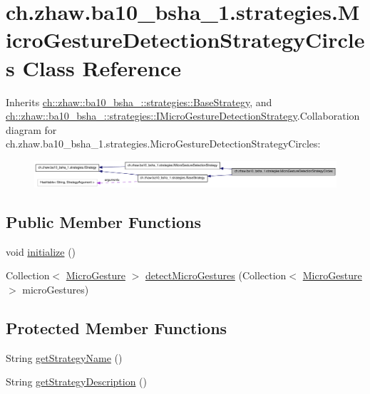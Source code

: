 \hypertarget{classch_1_1zhaw_1_1ba10__bsha__1_1_1strategies_1_1MicroGestureDetectionStrategyCircles}{
\section{ch.zhaw.ba10\_\-bsha\_\-1.strategies.MicroGestureDetectionStrategyCircles Class Reference}
\label{classch_1_1zhaw_1_1ba10__bsha__1_1_1strategies_1_1MicroGestureDetectionStrategyCircles}
}


Inherits \hyperlink{classch_1_1zhaw_1_1ba10__bsha__1_1_1strategies_1_1BaseStrategy}{ch::zhaw::ba10\_\-bsha\_::strategies::BaseStrategy}, and \hyperlink{interfacech_1_1zhaw_1_1ba10__bsha__1_1_1strategies_1_1IMicroGestureDetectionStrategy}{ch::zhaw::ba10\_\-bsha\_::strategies::IMicroGestureDetectionStrategy}.Collaboration diagram for ch.zhaw.ba10\_\-bsha\_\-1.strategies.MicroGestureDetectionStrategyCircles:\nopagebreak
\begin{figure}[H]
\begin{center}
\leavevmode
\includegraphics[width=400pt]{classch_1_1zhaw_1_1ba10__bsha__1_1_1strategies_1_1MicroGestureDetectionStrategyCircles__coll__graph}
\end{center}
\end{figure}
\subsection*{Public Member Functions}
\begin{DoxyCompactItemize}
\item 
void \hyperlink{classch_1_1zhaw_1_1ba10__bsha__1_1_1strategies_1_1MicroGestureDetectionStrategyCircles_a275de6238273284cc18163f631180be8}{initialize} ()
\item 
Collection$<$ \hyperlink{classch_1_1zhaw_1_1ba10__bsha__1_1_1service_1_1MicroGesture}{MicroGesture} $>$ \hyperlink{classch_1_1zhaw_1_1ba10__bsha__1_1_1strategies_1_1MicroGestureDetectionStrategyCircles_a1ce3987ae892eba2d0cf644a111933d3}{detectMicroGestures} (Collection$<$ \hyperlink{classch_1_1zhaw_1_1ba10__bsha__1_1_1service_1_1MicroGesture}{MicroGesture} $>$ microGestures)
\end{DoxyCompactItemize}
\subsection*{Protected Member Functions}
\begin{DoxyCompactItemize}
\item 
String \hyperlink{classch_1_1zhaw_1_1ba10__bsha__1_1_1strategies_1_1MicroGestureDetectionStrategyCircles_a73a3d1a9b8047909777b53094ea99f9b}{getStrategyName} ()
\item 
String \hyperlink{classch_1_1zhaw_1_1ba10__bsha__1_1_1strategies_1_1MicroGestureDetectionStrategyCircles_af8c0c9ae9f2a172773c4a76833d2b687}{getStrategyDescription} ()
\end{DoxyCompactItemize}


